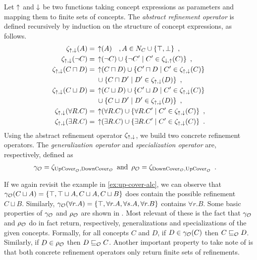 \begin{definition}
  Let $\operatorname{\uparrow}$ and $\operatorname{\downarrow}$ be two functions taking concept expressions as parameters and mapping them to finite sets of concepts.
  The \emph{abstract refinement operator} is defined recursively by induction on the structure of concept expressions, as follows.
  \begin{align*}
    \zeta_{\operatorname{\uparrow},\operatorname{\downarrow}}(A) ={} & \operatorname{\uparrow}(A) \quad, A \in N_C \cup \{\top, \bot\} \enspace, \\
    \zeta_{\operatorname{\uparrow},\operatorname{\downarrow}}(\lnot C) ={} & \operatorname{\uparrow}(\lnot C) \cup \{ \lnot C' \mid C' \in \zeta_{\operatorname{\downarrow},\operatorname{\uparrow}}(C) \} \enspace, \\
    \zeta_{\operatorname{\uparrow},\operatorname{\downarrow}}(C \sqcap D) ={} & \operatorname{\uparrow}(C \sqcap D) \cup \{ C' \sqcap D \mid C' \in \zeta_{\operatorname{\uparrow},\operatorname{\downarrow}}(C) \} \\
    & \cup \{ C \sqcap D' \mid D' \in \zeta_{\operatorname{\uparrow},\operatorname{\downarrow}}(D) \} \enspace, \\
    \zeta_{\operatorname{\uparrow},\operatorname{\downarrow}}(C \sqcup D) ={} & \operatorname{\uparrow}(C \sqcup D) \cup \{ C' \sqcup D \mid C' \in \zeta_{\operatorname{\uparrow},\operatorname{\downarrow}}(C) \} \\
    & \cup \{ C \sqcup D' \mid D' \in \zeta_{\operatorname{\uparrow},\operatorname{\downarrow}}(D) \} \enspace, \\
    \zeta_{\operatorname{\uparrow},\operatorname{\downarrow}}(\forall R.C) ={} & \operatorname{\uparrow}(\forall R.C)
    \cup \{ \forall R.C' \mid C' \in \zeta_{\operatorname{\uparrow},\operatorname{\downarrow}}(C) \} \enspace, \\
    \zeta_{\operatorname{\uparrow},\operatorname{\downarrow}}(\exists R.C) ={} & \operatorname{\uparrow}(\exists R.C)
    \cup \{ \exists R.C' \mid C' \in \zeta_{\operatorname{\uparrow},\operatorname{\downarrow}}(C) \} \enspace.
  \end{align*}
  Using the abstract refinement operator $\zeta_{\operatorname{\uparrow},\operatorname{\downarrow}}$, we build two concrete refinement operators. The \emph{generalization operator} and \emph{specialization operator} are, respectively, defined as
  \begin{align*}
    \gamma_\mathcal{O} &= \zeta_{{\operatorname{UpCover}}_\mathcal{O},{\operatorname{DownCover}}_\mathcal{O}} \enspace \text{and} \enspace
    \rho_\mathcal{O} = \zeta_{{\operatorname{DownCover}}_\mathcal{O},{\operatorname{UpCover}}_\mathcal{O}} \enspace.
  \end{align*}
\end{definition}

If we again revisit the example in \cref{ex:up-cover-alc}, we can observe that $\gamma_\mathcal{O}(C \sqcup A) = \{ \top, \top \sqcup A, C \sqcup A, C \sqcup B \}$ does contain the possible refinement $C \sqcup B$. Similarly, $\gamma_\mathcal{O}(\forall r.A) = \{ \top, \forall r.A, \forall s.A, \forall r.B \}$ contains $\forall r.B$. Some basic properties of $\gamma_\mathcal{O}$ and $\rho_\mathcal{O}$ are shown in \cite{troquard2018repairing}. Most relevant of these is the fact that $\gamma_\mathcal{O}$ and $\rho_\mathcal{O}$ do in fact return, respectively, generalizations and specializations of the given concepts. Formally, for all concepts $C$ and $D$, if $D \in \gamma_\mathcal{O}(C)$ then $C \sqsubseteq_\mathcal{O} D$. Similarly, if $D \in \rho_\mathcal{O}$ then $D \sqsubseteq_\mathcal{O} C$. Another important property to take note of is that both concrete refinement operators only return finite sets of refinements.

